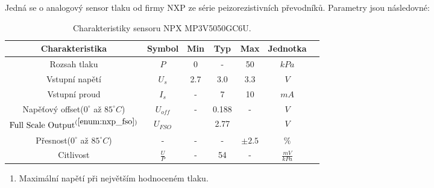 Jedná se o analogový sensor tlaku od firmy NXP ze série peizorezistivních převodníků. Parametry jsou následovné:
\begin{table}[H]
    \label{tab:nxp_properties}
    \caption{Charakteristiky sensoru NPX MP3V5050GC6U. \cite{cite:NXP}}
    \begin{ctucolortab}
        \begin{tabular}{ccccccc}
            \toprule
            Charakteristika                                         & Symbol        & Min & Typ   & Max        & Jednotka         & \\ \midrule
            Rozsah tlaku                                            & $P$           & 0   & -     & 50         & $kPa$            & \\
            Vstupní napětí                                          & $U_{s}$       & 2.7 & 3.0   & 3.3        & $V$              & \\
            Vstupní proud                                           & $I_{s}$       & -   & 7     & 10         & $mA$             & \\
            Napěťový offset($0^{\circ}$ až $ 85^{\circ}  C $)       & $U_{off}$     & -   & 0.188 & -          & $V$              & \\
            $\textnormal{Full Scale Output}^{(\ref{enum:nxp_fso})}$ & $U_{FSO}$     &     & 2.77  &            & $V$              & \\
            Přesnost($0^{\circ}$ až $ 85^{\circ} C$)                & -             & -   & -     & $\pm 2.5 $ & $\%$             & \\
            Citlivost                                               & $\frac{U}{P}$ & -   & 54    & -          & $\frac{mV}{kPa}$ & \\
            \bottomrule
        \end{tabular}
    \end{ctucolortab}

    \begin{enumerate}
        \item \label{enum:nxp_fso} Maximální napětí při největším hodnoceném tlaku.
    \end{enumerate}
\end{table}

